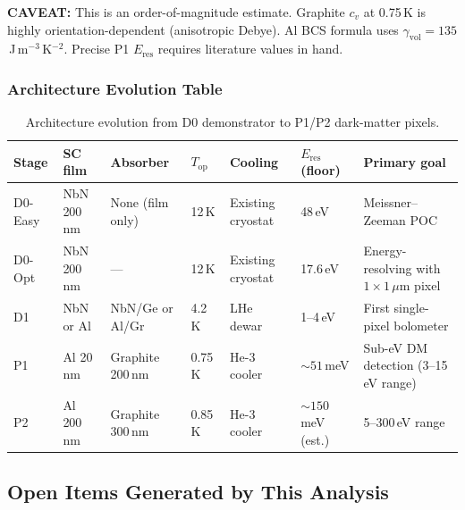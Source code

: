 \textbf{CAVEAT:} This is an order-of-magnitude estimate. Graphite $c_v$ at 0.75\,K is
highly orientation-dependent (anisotropic Debye). Al BCS formula uses
$\gamma_\mathrm{vol} = 135$\,J\,m$^{-3}$\,K$^{-2}$.
Precise P1 $E_\mathrm{res}$ requires literature values in hand.

\subsubsection{Architecture Evolution Table}
\label{sec:q7_arch}

\begin{table}[ht]
\centering
\caption{Architecture evolution from D0 demonstrator to P1/P2 dark-matter pixels.}
\label{tab:q7_arch_evolution}
\small
\begin{tabular}{@{}p{1.5cm}p{2cm}p{2cm}p{1.5cm}p{2.5cm}p{2cm}p{2.5cm}@{}}
\toprule
Stage & SC film & Absorber & $T_\mathrm{op}$ & Cooling & $E_\mathrm{res}$ (floor) & Primary goal \\
\midrule
D0-Easy & NbN 200\,nm & None (film only) & 12\,K & Existing cryostat & 48\,eV & Meissner--Zeeman POC \\
D0-Opt & NbN 200\,nm & --- & 12\,K & Existing cryostat & 17.6\,eV & Energy-resolving with $1 \times 1\,\mu$m pixel \\
D1 & NbN or Al & NbN/Ge or Al/Gr & 4.2\,K & LHe dewar & 1--4\,eV & First single-pixel bolometer \\
P1 & Al 20\,nm & Graphite 200\,nm & 0.75\,K & He-3 cooler & $\sim\!51$\,meV & Sub-eV DM detection (3--15\,eV range) \\
P2 & Al 200\,nm & Graphite 300\,nm & 0.85\,K & He-3 cooler & $\sim\!150$\,meV (est.) & 5--300\,eV range \\
\bottomrule
\end{tabular}
\end{table}

\subsection{Open Items Generated by This Analysis}
\label{sec:q7_open_items}


